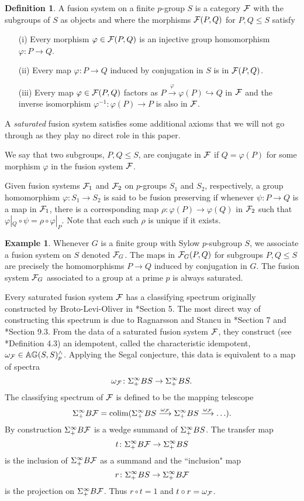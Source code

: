 \documentclass[10pt]{amsart}
\theoremstyle{definition}
\DeclareMathOperator{\colim}{colim}
\newtheorem{definition}[theorem]{Definition}
\newtheorem{example}[theorem]{Example}
\renewcommand{\phi}{\varphi}
\begin{document}
\begin{definition}
A fusion system on a finite $p$-group $S$ is a category $\mathcal{F}$ with the subgroups of $S$ as objects and where the morphisms $\mathcal{F}(P,Q)$ for $P,Q\leq S$ satisfy
\begin{itemize}
\item[(i)] Every morphism $\phi\in \cF(P,Q)$ is an injective group homomorphism $\phi\colon P\to Q$.
\item[(ii)] Every map $\phi\colon P\to Q$ induced by conjugation in $S$ is in $\mathcal{F}(P,Q)$.
\item[(iii)] Every map $\phi\in\cF(P,Q)$ factors as $P\xrightarrow{\phi} \phi(P) \hookrightarrow Q$ in $\mathcal{F}$ and the inverse isomorphism $\phi^{-1}\colon \phi(P)\to P$ is also in $\mathcal{F}$.
\end{itemize}
A \emph{saturated} fusion system satisfies some additional axioms that we will not go through as they play no direct role in this paper.

We say that two subgroups, $P, Q \leq S$, are conjugate in $\mathcal{F}$ if $Q = \phi(P)$ for some morphism $\phi$ in the fusion system $\mathcal{F}$.

Given fusion systems $\mathcal{F}_1$ and $\mathcal{F}_2$ on $p$-groups $S_1$ and $S_2$, respectively, a group homomorphism $\phi\colon S_1\to S_2$ is said to be fusion preserving if whenever $\psi\colon P\to Q$ is a map in $\mathcal{F}_1$, there is a corresponding map $\rho\colon \phi(P)\to \phi(Q)$ in $\mathcal{F}_2$ such that $\phi|_{Q}\circ \psi = \rho\circ \phi|_P$. Note that each such $\rho$ is unique if it exists.
\end{definition}

\begin{example}
Whenever $G$ is a finite group with Sylow $p$-subgroup $S$, we associate a fusion system on $S$ denoted $\mathcal{F}_G$. The maps in $\mathcal{F}_G(P,Q)$ for subgroups $P,Q\leq S$ are precisely the homomorphisms $P\to Q$ induced by conjugation in $G$.
The fusion system $\mathcal{F}_G$ associated to a group at a prime $p$ is always saturated.
\end{example}

Every saturated fusion system $\mathcal{F}$ has a classifying spectrum originally constructed by Broto-Levi-Oliver in \cite{BLO2}*{Section 5}. The most direct way of constructing this spectrum is due to Ragnarsson and Stancu in \cite{Ragnarsson}*{Section 7} and \cite{RagnarssonStancu}*{Section 9.3}. From the data of a saturated fusion system $\mathcal{F}$, they construct (see \cite{Ragnarsson}*{Definition 4.3}) an idempotent, called the characteristic idempotent, $\omega_{\mathcal{F}} \in \mathbb{A} \mathbb{G}(S,S)^{\wedge}_{p}$. Applying the Segal conjecture, this data is equivalent to a map of spectra
\[
\omega_{\mathcal{F}} \colon \Sigma^{\infty}_{+} BS \to \Sigma^{\infty}_{+} BS.
\]
The classifying spectrum of $\mathcal{F}$ is defined to be the mapping telescope
\[
\Sinfp B\cF = \colim ( \Sinfp BS \lra{\omega_{\cF}} \Sinfp BS \lra{\omega_{\cF}} \ldots).
\]
By construction $\Sigma^{\infty}_{+} B\mathcal{F}$ is a wedge summand of $\Sigma^{\infty}_{+} BS$. The transfer map
\[
t \colon \Sigma^{\infty}_{+} B\mathcal{F} \rightarrow \Sigma^{\infty}_{+} BS
\]
is the inclusion of $\Sigma^{\infty}_{+} B\mathcal{F}$ as a summand and the ``inclusion" map
\[
r \colon \Sigma^{\infty}_{+} BS \rightarrow \Sigma^{\infty}_{+} B\mathcal{F}
\]
is the projection on $\Sigma^{\infty}_{+} B\mathcal{F}$. Thus $r \circ t = 1$ and $t\circ r=\omega_{\mathcal{F}}$.
\end{document}
